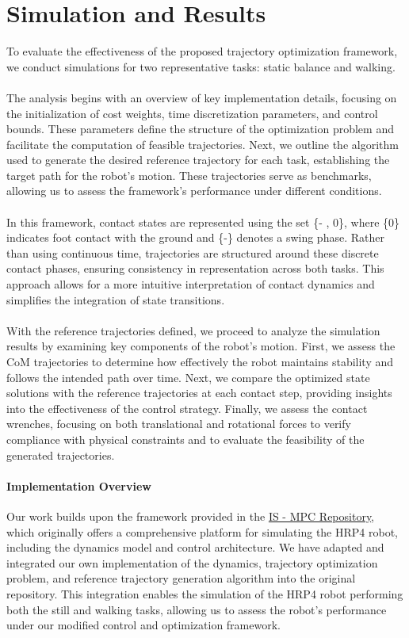 \documentclass[main.tex]{subfiles}
\begin{document}
\begin{sloppypar}
\section{Simulation and Results}
\label{sec:newsimulation}
To evaluate the effectiveness of the proposed trajectory optimization framework, we conduct simulations for two representative tasks: static balance and walking. \\
\\
The analysis begins with an overview of key implementation details, focusing on the initialization of cost weights, time discretization parameters, and control bounds. These parameters define the structure of the optimization problem and facilitate the computation of feasible trajectories. Next, we outline the algorithm used to generate the desired reference trajectory for each task, establishing the target path for the robot’s motion. These trajectories serve as benchmarks, allowing us to assess the framework’s performance under different conditions.\\
\\
In this framework, contact states are represented using the set \{- , 0\}, where \{0\} indicates foot contact with the ground and \{-\} denotes a swing phase. Rather than using continuous time, trajectories are structured around these discrete contact phases, ensuring consistency in representation across both tasks. This approach allows for a more intuitive interpretation of contact dynamics and simplifies the integration of state transitions. \\
\\
With the reference trajectories defined, we proceed to analyze the simulation results by examining key components of the robot’s motion. First, we assess the CoM trajectories to determine how effectively the robot maintains stability and follows the intended path over time. Next, we compare the optimized state solutions with the reference trajectories at each contact step, providing insights into the effectiveness of the control strategy. Finally, we assess the contact wrenches, focusing on both translational and rotational forces to verify compliance with physical constraints and to evaluate the feasibility of the generated trajectories. \\
\paragraph{Implementation Overview}
Our work builds upon the framework provided in the \href{[https://github.com/DIAG-Robotics-Lab/ismpc}{IS - MPC Repository}, which originally offers a comprehensive platform for simulating the HRP4 robot, including the dynamics model and control architecture. We have adapted and integrated our own implementation of the dynamics, trajectory optimization problem, and reference trajectory generation algorithm into the original repository. This integration enables the simulation of the HRP4 robot performing both the still and walking tasks, allowing us to assess the robot’s performance under our modified control and optimization framework.

\end{sloppypar}
\end{document}
